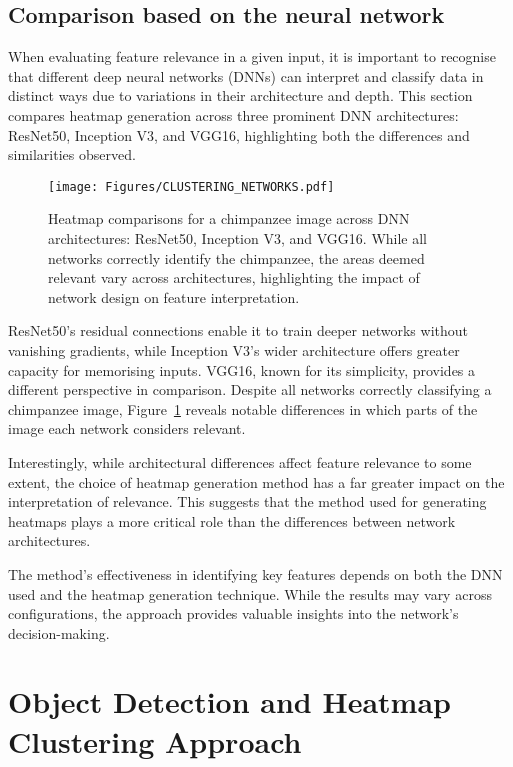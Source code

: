 \subsection{Comparison based on the neural network}

When evaluating feature relevance in a given input, it is important to recognise that different deep neural networks (DNNs) can interpret and classify data in distinct ways due to variations in their architecture and depth. This section compares heatmap generation across three prominent DNN architectures: ResNet50, Inception V3, and VGG16, highlighting both the differences and similarities observed.

\begin{figure}[ht!]
	\begin{center}
\texttt{[image: Figures/CLUSTERING\_NETWORKS.pdf]}
\end{center}
\caption{Heatmap comparisons for a chimpanzee image across DNN architectures: ResNet50, Inception V3, and VGG16. While all networks correctly identify the chimpanzee, the areas deemed relevant vary across architectures, highlighting the impact of network design on feature interpretation.}
\label{Fig:CLUSTERING_NETWORKS}
\end{figure}

ResNet50's residual connections enable it to train deeper networks without vanishing gradients, while Inception V3's wider architecture offers greater capacity for memorising inputs. VGG16, known for its simplicity, provides a different perspective in comparison. Despite all networks correctly classifying a chimpanzee image, Figure~\ref{Fig:CLUSTERING_NETWORKS} reveals notable differences in which parts of the image each network considers relevant. 

Interestingly, while architectural differences affect feature relevance to some extent, the choice of heatmap generation method has a far greater impact on the interpretation of relevance. This suggests that the method used for generating heatmaps plays a more critical role than the differences between network architectures.

The method’s effectiveness in identifying key features depends on both the DNN used and the heatmap generation technique. While the results may vary across configurations, the approach provides valuable insights into the network’s decision-making. 

\section{Object Detection and Heatmap Clustering Approach}

